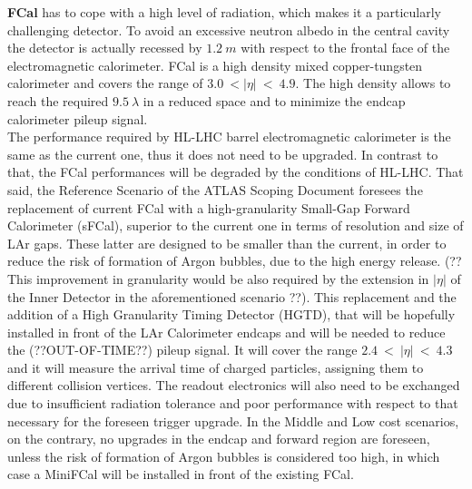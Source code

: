 \documentclass[a4paper,12pt]{article}
\begin{document}
\textbf{FCal} has to cope with a high level of radiation, which makes it a particularly challenging detector. To avoid an excessive neutron albedo in the central cavity the detector is actually recessed by 
$1.2\ m$ with respect to the frontal face of the electromagnetic calorimeter. FCal is a high density mixed copper-tungsten calorimeter and covers the range of $3.0\ < |\eta|\ <\ 4.9$.  The high density allows to reach the required $9.5\ \lambda$ in a reduced space and to minimize the endcap calorimeter pileup signal.  \\[2pt]

The performance required by HL-LHC barrel electromagnetic calorimeter is the same as the current one, thus it does not need to be upgraded. In contrast to that, the FCal performances will be degraded by the conditions of HL-LHC. That said, the Reference Scenario of the ATLAS Scoping Document\cite{scoping} foresees the replacement of current FCal with a high-granularity Small-Gap Forward Calorimeter (sFCal), superior to the current one in terms of resolution and size of LAr gaps. These latter are designed to be smaller than the current, in order to reduce the risk of formation of Argon bubbles, due to the high energy release. (?? This improvement in granularity would be also required by the extension in $|\eta|$ of the Inner Detector in the aforementioned scenario ??). This replacement and the addition of a High Granularity Timing Detector (HGTD), that will be hopefully installed in front of the LAr Calorimeter endcaps and will be needed to reduce the (??OUT-OF-TIME??) pileup signal. It will cover the range $2.4\ <\ |\eta|\ <\ 4.3$ and it will measure the arrival time of charged particles, assigning them to different collision vertices. The readout electronics will also need to be exchanged due to insufficient radiation tolerance and poor performance with respect to that necessary for the foreseen trigger upgrade. In the Middle and Low cost 
scenarios, on the contrary, no upgrades in the endcap and forward region are foreseen, unless the risk of formation of Argon bubbles is considered too high, in which case a MiniFCal will be installed in front of the existing FCal. 
\end{document}
